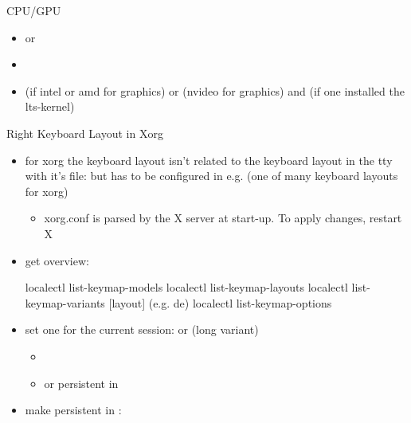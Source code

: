 \begin{frame}[fragile]{CPU/GPU}
  \begin{itemize}
    \item {} or 
    \item {}
    \item {} (if intel or amd for graphics) or  (nvideo for graphics) and  (if one installed the lts-kernel)
  \end{itemize}
\end{frame}

\begin{frame}{Right Keyboard Layout in Xorg\vspace{0.5cm}}
  \begin{itemize}
    \item for xorg the keyboard layout isn't related to the keyboard layout in the tty with it's file:  but has to be configured in e.g.  (one of many keyboard layouts for xorg)
      \begin{itemize}
        \item xorg.conf is parsed by the X server at start-up. To apply changes, restart X
      \end{itemize}
    \item \alert{get overview:}
      \begin{terminal}[minted language=bash]
        localectl list-keymap-models
        localectl list-keymap-layouts
        localectl list-keymap-variants [layout] (e.g. de)
        localectl list-keymap-options
      \end{terminal}
  \item set one for the current session:  or  (long variant)
    \begin{itemize}
      \item {\tiny {}}
      \item or persistent in 
    \end{itemize}
  \item make persistent in :

\end{itemize}
\end{frame}
